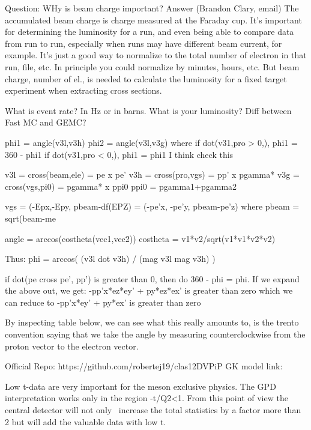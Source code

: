     Question: WHy is beam charge important?
    Answer (Brandon Clary, email) The accumulated beam charge is charge measured at the Faraday cup. It's important for determining the luminosity for a run, and even being able to compare data from run to run, especially when runs may have different beam current, for example. It's just a good way to normalize to the total number of electron in that run, file, etc. In principle you could normalize by minutes, hours, etc. But beam charge, number of el., is needed to calculate the luminosity for a fixed target experiment when extracting cross sections.


    What is event rate? In Hz or in barns. What is your luminosity?
    Diff between Fast MC and GEMC?

            

phi1 = angle(v3l,v3h)
phi2 = angle(v3l,v3g)
where if dot(v31,pro > 0,), phi1 =  360 - phi1
if  dot(v31,pro < 0,), phi1 =  phi1 I think check this

v3l = cross(beam,ele) = pe x pe'
v3h = cross(pro,vgs) = pp' x pgamma*
v3g = cross(vgs,pi0) = pgamma* x ppi0
ppi0 = pgamma1+pgamma2

vgs = (-Epx,-Epy, pbeam-df(EPZ) = (-pe'x, -pe'y, pbeam-pe'z) where pbeam = sqrt(beam-me%

angle = arccos(costheta(vec1,vec2))
costheta = v1*v2/sqrt(v1*v1*v2*v2)

Thus:
phi = arccos( (v3l dot v3h) / (mag v3l mag v3h) ) 


if dot(pe cross pe', pp') is greater than 0, then do 360 - phi = phi.
If we expand the above out, we get:
-pp'x*ez*ey' + py*ez*ex' is greater than zero
which we can reduce to 
-pp'x*ey' + py*ex' is greater than zero

By inspecting table below, we can see what this really amounts to, is the trento convention saying that we take the angle by measuring counterclockwise from the proton vector to the electron vector.


Official Repo: https://github.com/robertej19/clas12DVPiP
GK model link: 

         


Low t-data are very important for the meson exclusive physics. The GPD interpretation works only in the region -t/Q2<1. From this point of view the central detector will not only  increase the total statistics by a factor more than 2 but will add the valuable data with low t.


